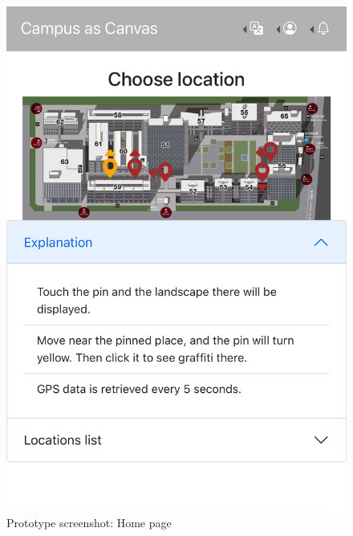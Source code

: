 \begin{figure}
  \begin{minipage}{0.32\textwidth}
    \centering
    \includegraphics[width=0.9\linewidth]{resources/4_methodology/prototype_home.png}
      \caption{Prototype screenshot: Home page}
  \end{minipage}\hfill
  \begin{minipage}{0.32\textwidth}
    \centering

\end{minipage}
\end{figure}
